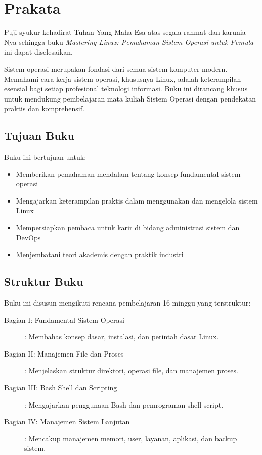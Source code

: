 
\chapter*{Prakata}

Puji syukur kehadirat Tuhan Yang Maha Esa atas segala rahmat dan karunia-Nya
sehingga buku \textit{Mastering Linux: Pemahaman Sistem Operasi untuk Pemula}
ini dapat diselesaikan.

Sistem operasi merupakan fondasi dari semua sistem komputer modern. Memahami
cara kerja sistem operasi, khususnya Linux, adalah keterampilan esensial bagi
setiap profesional teknologi informasi. Buku ini dirancang khusus untuk mendukung
pembelajaran mata kuliah Sistem Operasi dengan pendekatan praktis dan komprehensif.

\section*{Tujuan Buku}

Buku ini bertujuan untuk:

\begin{itemize}
    \item Memberikan pemahaman mendalam tentang konsep fundamental sistem operasi
    \item Mengajarkan keterampilan praktis dalam menggunakan dan mengelola sistem Linux
    \item Mempersiapkan pembaca untuk karir di bidang administrasi sistem dan DevOps
    \item Menjembatani teori akademis dengan praktik industri
\end{itemize}

\section*{Struktur Buku}

Buku ini disusun mengikuti rencana pembelajaran 16 minggu yang terstruktur:

\begin{description}
    \item[Bagian I: Fundamental Sistem Operasi]: Membahas konsep dasar, instalasi,
          dan perintah dasar Linux.
    \item[Bagian II: Manajemen File dan Proses]: Menjelaskan struktur direktori,
          operasi file, dan manajemen proses.
    \item[Bagian III: Bash Shell dan Scripting]: Mengajarkan penggunaan Bash
          dan pemrograman shell script.
    \item[Bagian IV: Manajemen Sistem Lanjutan]: Mencakup manajemen memori, user,
          layanan, aplikasi, dan backup sistem.
\end{description}

